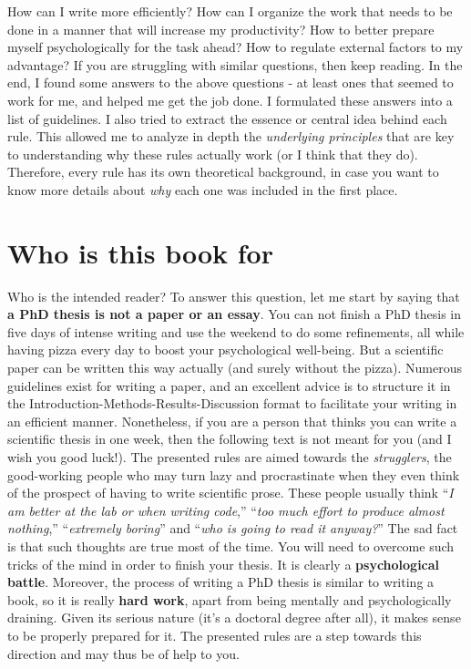 \documentclass[
  12pt,
]{book}
\begin{document}
How can I write more efficiently?
How can I organize the work that needs to be done in a manner that will increase my productivity?
How to better prepare myself psychologically for the task ahead?
How to regulate external factors to my advantage?
If you are struggling with similar questions, then keep reading.
In the end, I found some answers to the above questions - at least ones that seemed to work for me, and helped me get the job done.
I formulated these answers into a list of guidelines.
I also tried to extract the essence or central idea behind each rule.
This allowed me to analyze in depth the \emph{underlying principles} that are key to understanding why these rules actually work (or I think that they do).
Therefore, every rule has its own theoretical background, in case you want to know more details about \emph{why} each one was included in the first place.

\hypertarget{who-is-this-book-for}{%
\section*{Who is this book for}\label{who-is-this-book-for}}

Who is the intended reader?
To answer this question, let me start by saying that \textbf{a PhD thesis is not a paper or an essay}.
You can not finish a PhD thesis in five days of intense writing and use the weekend to do some refinements, all while having pizza every day to boost your psychological well-being.
But a scientific paper can be written this way actually (and surely without the pizza).
Numerous guidelines exist for writing a paper, and an excellent advice is to structure it in the Introduction-Methods-Results-Discussion format to facilitate your writing in an efficient manner.
Nonetheless, if you are a person that thinks you can write a scientific thesis in one week, then the following text is not meant for you (and I wish you good luck!).
The presented rules are aimed towards the \emph{strugglers}, the good-working people who may turn lazy and procrastinate when they even think of the prospect of having to write scientific prose.
These people usually think ``\emph{I am better at the lab or when writing code},'' ``\emph{too much effort to produce almost nothing},'' ``\emph{extremely boring}'' and ``\emph{who is going to read it anyway?}''
The sad fact is that such thoughts are true most of the time.
You will need to overcome such tricks of the mind in order to finish your thesis.
It is clearly a \textbf{psychological battle}.
Moreover, the process of writing a PhD thesis is similar to writing a book, so it is really \textbf{hard work}, apart from being mentally and psychologically draining.
Given its serious nature (it's a doctoral degree after all), it makes sense to be properly prepared for it.
The presented rules are a step towards this direction and may thus be of help to you.
\end{document}

